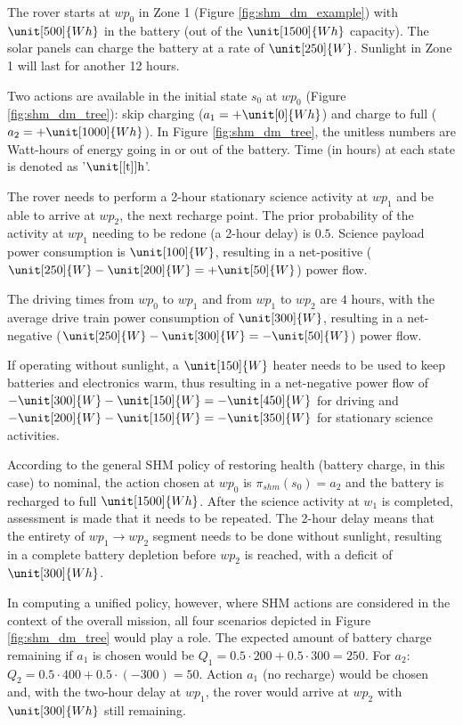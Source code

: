 \begin{ex}
\label{ex:separated_unified}
The rover starts at $wp_0$ in Zone 1 (Figure \ref{fig:shm_dm_example}) with $\unit[500]{Wh}$ in the battery (out of the $\unit[1500]{Wh}$ capacity). The solar panels can charge the battery at a rate of $\unit[250]{W}$. Sunlight in Zone 1 will last for another 12 hours.

Two actions are available in the initial state $s_0$ at $wp_0$ (Figure \ref{fig:shm_dm_tree}): skip charging ($a_1 = + \unit[0]{Wh}$) and charge to full ($a_2 = + \unit[1000]{Wh}$). In Figure \ref{fig:shm_dm_tree}, the unitless numbers are Watt-hours of energy going in or out of the battery. Time (in hours) at each state is denoted as '$\unit[\text{[t]}]{\text{h}}$'.

The rover needs to perform a 2-hour stationary science activity at $wp_1$ and be able to arrive at $wp_2$, the next recharge point. The prior probability of the activity at $wp_1$ needing to be redone (a 2-hour delay) is $0.5$. Science payload power consumption is $\unit[100]{W}$, resulting in a net-positive ($\unit[250]{W} -\unit[200]{W} = +\unit[50]{W}$) power flow.

The driving times from $wp_0$ to $wp_1$ and from $wp_1$ to $wp_2$ are $4$ hours, with the average drive train power consumption of $\unit[300]{W}$, resulting in a net-negative ($\unit[250]{W} -\unit[300]{W} = -\unit[50]{W}$) power flow.

If operating without sunlight, a $\unit[150]{W}$ heater needs to be used to keep batteries and electronics warm, thus resulting in a net-negative power flow of $-\unit[300]{W} -\unit[150]{W} = - \unit[450]{W}$ for driving and $- \unit[200]{W} - \unit[150]{W} = - \unit[350]{W}$ for stationary science activities.
\end{ex}

According to the general SHM policy of restoring health (battery charge, in this case) to nominal, the action chosen at $wp_0$ is $\pi_{shm}(s_0) = a_2$ and the battery is recharged to full $\unit[1500]{Wh}$. After the science activity at $w_1$ is completed, assessment is made that it needs to be repeated. The 2-hour delay means that the entirety of $wp_1 \rightarrow wp_2$ segment needs to be done without sunlight, resulting in a complete battery depletion before $wp_2$ is reached, with a deficit of $\unit[300]{Wh}$.

In computing a unified policy, however, where SHM actions are considered in the context of the overall mission, all four scenarios depicted in Figure \ref{fig:shm_dm_tree} would play a role. The expected amount of battery charge remaining if $a_1$ is chosen would be $Q_1 = 0.5 \cdot 200 + 0.5 \cdot 300 = 250$. For $a_2$: $Q_2 = 0.5 \cdot 400 + 0.5 \cdot (-300) = 50$. Action $a_1$ (no recharge) would be chosen and, with the two-hour delay at $wp_1$, the rover would arrive at $wp_2$ with $\unit[300]{Wh}$ still remaining.

